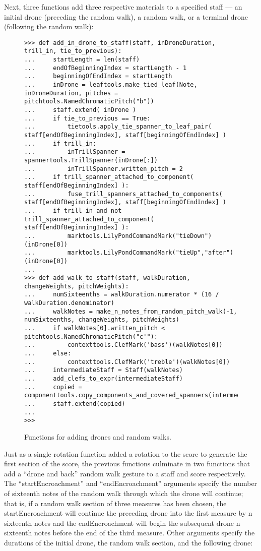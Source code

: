 Next, three functions add three respective materials to a specified staff --- an initial drone (preceding the random walk), a random walk, or a terminal drone (following the random walk):

\begin{figure}[H]
\begin{lstlisting}[basicstyle=\scriptsize\ttfamily, breaklines=True, tabsize=4, showtabs=false, showspaces=false]
>>> def add_in_drone_to_staff(staff, inDroneDuration, trill_in, tie_to_previous):
...     startLength = len(staff)
...     endOfBeginningIndex = startLength - 1
...     beginningOfEndIndex = startLength
...     inDrone = leaftools.make_tied_leaf(Note, inDroneDuration, pitches = pitchtools.NamedChromaticPitch("b"))
...     staff.extend( inDrone )
...     if tie_to_previous == True:
...         tietools.apply_tie_spanner_to_leaf_pair( staff[endOfBeginningIndex], staff[beginningOfEndIndex] )
...     if trill_in:
...         inTrillSpanner = spannertools.TrillSpanner(inDrone[:])
...         inTrillSpanner.written_pitch = 2
...     if trill_spanner_attached_to_component( staff[endOfBeginningIndex] ):
...         fuse_trill_spanners_attached_to_components( staff[endOfBeginningIndex], staff[beginningOfEndIndex] )
...     if trill_in and not trill_spanner_attached_to_component( staff[endOfBeginningIndex] ):
...         marktools.LilyPondCommandMark("tieDown")(inDrone[0])
...         marktools.LilyPondCommandMark("tieUp","after")(inDrone[0])
... 
>>> def add_walk_to_staff(staff, walkDuration, changeWeights, pitchWeights):
...     numSixteenths = walkDuration.numerator * (16 / walkDuration.denominator)
...     walkNotes = make_n_notes_from_random_pitch_walk(-1, numSixteenths, changeWeights, pitchWeights)
...     if walkNotes[0].written_pitch < pitchtools.NamedChromaticPitch("c'"):
...         contexttools.ClefMark('bass')(walkNotes[0])
...     else:
...         contexttools.ClefMark('treble')(walkNotes[0])
...     intermediateStaff = Staff(walkNotes)
...     add_clefs_to_expr(intermediateStaff)
...     copied = componenttools.copy_components_and_covered_spanners(intermediateStaff[:])
...     staff.extend(copied)
... 
>>> \end{lstlisting}

\caption{Functions for adding drones and random walks. } 
\end{figure}

Just as a single rotation function added a rotation to the score to generate the first section of the score, the previous functions culminate in two functions that add a ``drone and back'' random walk gesture to a staff and score respectively. The ``startEncroachment'' and ``endEncroachment'' arguments specify the number of sixteenth notes of the random walk through which the drone will continue; that is, if a random walk section of three measures has been chosen, the startEncroachment will continue the preceding drone into the first measure by n sixteenth notes and the endEncroachment will begin the subsequent drone n sixteenth notes before the end of the third measure. Other arguments specify the durations of the initial drone, the random walk section, and the following drone:

